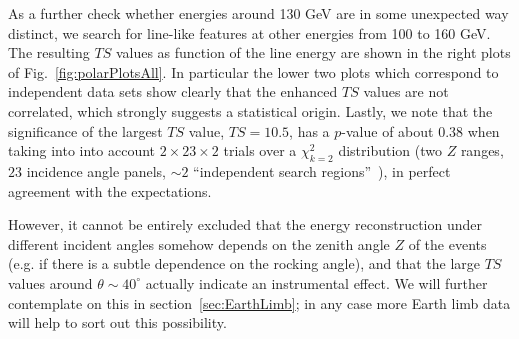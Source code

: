 \documentclass[aps,twocolumn,prd,superscriptaddress,showpacs,nofootinbib,fixfloat]{revtex4}
\begin{document}
As a further check whether energies around 130 GeV are in some unexpected way
distinct, we search for line-like features at other energies from 100 to 160
GeV. The resulting $TS$ values as function of the line energy are shown in the
right plots of Fig.~\ref{fig:polarPlotsAll}. In particular the lower two plots
which correspond to independent data sets show clearly that the enhanced $TS$
values are not correlated, which strongly suggests a statistical origin.
Lastly, we note that the significance of the largest $TS$ value, $TS=10.5$,
has a $p$-value of about $0.38$ when taking into into account
$2\times23\times2$ trials over a $\chi_{k=2}^2$ distribution (two $Z$ ranges,
$23$ incidence angle panels, $\sim2$ ``independent search
regions''~\cite{Vittels}), in perfect agreement with the expectations.

However, it cannot be entirely excluded that the energy reconstruction under
different incident angles somehow depends on the zenith angle $Z$ of the
events (e.g. if there is a subtle dependence on the rocking angle), and that
the large $TS$ values around $\theta\sim40^\circ$ actually indicate an
instrumental effect. We will further contemplate on this in
section~\ref{sec:EarthLimb}; in any case more Earth limb data will help to
sort out this possibility.
\end{document}
